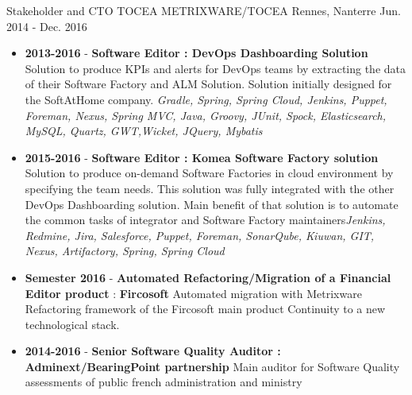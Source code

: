 \begin{cventries}
    \cventry
    {Stakeholder and CTO TOCEA} %
    {METRIXWARE/TOCEA} %
    {Rennes, Nanterre} %
    {Jun. 2014 - Dec. 2016} %
    {
        \begin{itemize}
            \item {\textbf{2013-2016 } - \textbf{Software Editor : DevOps Dashboarding Solution} Solution to produce KPIs and alerts for DevOps teams by extracting the data of their Software Factory and ALM Solution. Solution initially designed for the SoftAtHome company. \newline \textit{Gradle, Spring, Spring Cloud, Jenkins, Puppet, Foreman, Nexus, Spring MVC, Java, Groovy, JUnit, Spock, Elasticsearch, MySQL, Quartz, GWT,Wicket, JQuery, Mybatis}}
            \item {\textbf{2015-2016 } - \textbf{Software Editor : Komea Software Factory solution} Solution to produce on-demand Software Factories in cloud environment by specifying the team needs. This solution was fully integrated with the other DevOps Dashboarding solution. Main benefit of that solution is to automate the common tasks of integrator and Software Factory maintainers\newline \textit{Jenkins, Redmine, Jira, Salesforce, Puppet, Foreman, SonarQube, Kiuwan, GIT, Nexus, Artifactory, Spring, Spring Cloud}}
            \item \textbf{Semester 2016} - {\textbf{\textbf{Automated Refactoring/Migration} of a Financial Editor product} : \textbf{Fircosoft} Automated migration with Metrixware Refactoring framework of the Fircosoft main product Continuity to a new technological stack. }
            \item { \textbf{2014-2016 } - \textbf{Senior Software Quality Auditor : Adminext/BearingPoint partnership } Main auditor for Software Quality assessments of public french administration and ministry}

\end{itemize}}
\end{cventries}
